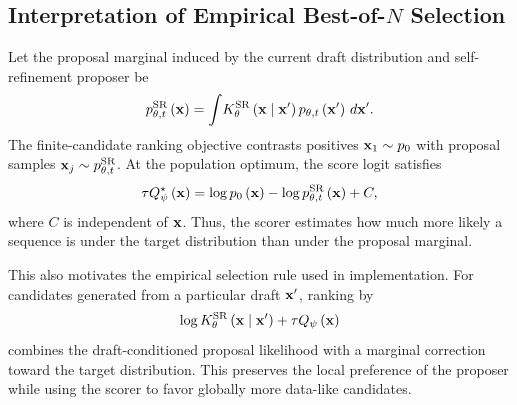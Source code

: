 \subsection{Interpretation of Empirical Best-of-$N$ Selection}
\label{app:log_ratio}

Let the proposal marginal induced by the current draft distribution and self-refinement proposer be
\begin{equation*}
    p_{\theta,t}^{\mathrm{SR}}\left(\mathbf{x}\right)
    =
    {\int}
    K_{\theta}^{\mathrm{SR}}\left(\mathbf{x}\mid\mathbf{x}'\right)
    p_{\theta,t}\left(\mathbf{x}'\right)
    \,d\mathbf{x}'.
    \label{eq:app_sr_marginal}
\end{equation*}
The finite-candidate ranking objective contrasts positives $\mathbf{x}_1\sim p_0$ with proposal samples $\mathbf{x}_j\sim p_{\theta,t}^{\mathrm{SR}}$. 
At the population optimum, the score logit satisfies
\begin{equation*}
    \tau Q_\psi^\star\left(\mathbf{x}\right)
    =
    \log p_0\left(\mathbf{x}\right)
    -
    \log p_{\theta,t}^{\mathrm{SR}}\left(\mathbf{x}\right)
    +
    C,
    \label{eq:app_marginal_log_ratio}
\end{equation*}
where $C$ is independent of $\mathbf{x}$. 
Thus, the scorer estimates how much more likely a sequence is under the target distribution than under the proposal marginal.

This also motivates the empirical selection rule used in implementation. 
For candidates generated from a particular draft $\mathbf{x}'$, ranking by
\begin{equation*}
    \log K_{\theta}^{\mathrm{SR}}\left(\mathbf{x}\mid\mathbf{x}'\right)
    +
    \tau Q_\psi\left(\mathbf{x}\right)
\end{equation*}
combines the draft-conditioned proposal likelihood with a marginal correction toward the target distribution. 
This preserves the local preference of the proposer while using the scorer to favor globally more data-like candidates.